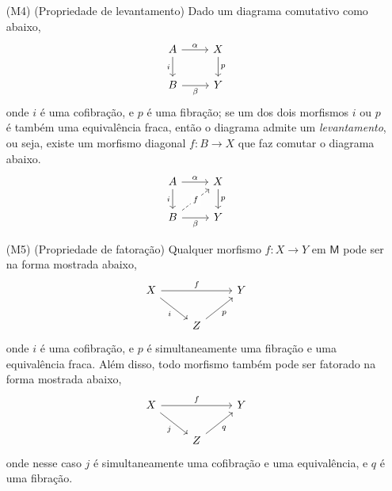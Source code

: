 \begin{defin}
\begin{enumerate}
  \item[(M4)] (Propriedade de levantamento) Dado um diagrama comutativo como abaixo,
    \begin{equation}\label{eq:diag_prob_levantamento}
      \begin{tikzcd}
        A
        \arrow[r, "\alpha"]
        \arrow[d, "i" swap]
        & X
        \arrow[d, "p"]
        \\ B
        \arrow[r, "\beta" swap]
        & Y
      \end{tikzcd}
    \end{equation}
    onde $i$ é uma cofibração, e $p$ é uma fibração; se um dos dois morfismos $i$ ou $p$ é também uma equivalência fraca, então o diagrama admite um \emph{levantamento}, ou seja, existe um morfismo diagonal $f: B \to X$ que faz comutar o diagrama abaixo.
    \begin{equation}\label{eq:diag_solucao_levantamento}
      \begin{tikzcd}
        A
        \arrow[r, "\alpha"]
        \arrow[d, "i" swap]
        & X
        \arrow[d, "p"]
        \\ B
        \arrow[r, "\beta" swap]
        \arrow[ru, dashed, "f" description]
        & Y
      \end{tikzcd}
    \end{equation}
    
  \item[(M5)] (Propriedade de fatoração) Qualquer morfismo $f: X \to Y$ em $\mathsf{M}$ pode ser na forma mostrada abaixo,
    \begin{equation}\label{eq:diag_fatoracao_cofib_fib_trivial}
      \begin{tikzcd}
        X
        \arrow[rr, "f"]
        \arrow[rd, "i" swap]
        & & Y
        \\ & Z
        \arrow[ru, "p" swap]
      \end{tikzcd}
    \end{equation}
    onde $i$ é uma cofibração, e $p$ é simultaneamente uma fibração e uma equivalência fraca.
    Além disso, todo morfismo também pode ser fatorado na forma mostrada abaixo,
    \begin{equation}\label{eq:diag_fatoracao_cofib_trivial_fib}
      \begin{tikzcd}
        X
        \arrow[rr, "f"]
        \arrow[rd, "j" swap]
        & & Y
        \\ & Z
        \arrow[ru, "q" swap]
      \end{tikzcd}
    \end{equation}
    onde nesse caso $j$ é simultaneamente uma cofibração e uma equivalência, e $q$ é uma fibração.
  \end{enumerate}
\end{defin}

